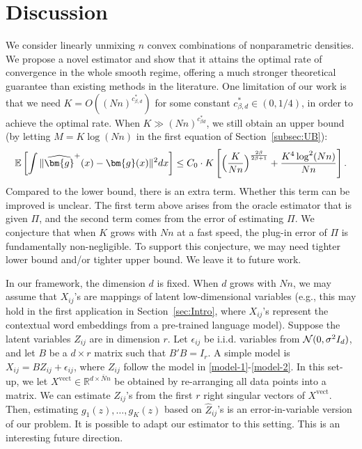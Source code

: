 \documentclass[preprint,11pt]{article}
\newcommand{\mbb}{\mathbb}
\numberwithin{equation}{section}
\begin{document}
\section{Discussion} \label{sec:Discuss}
We consider linearly unmixing $n$ convex combinations of nonparametric densities. 
We propose a novel estimator and show that it attains the optimal rate of convergence in the whole smooth regime, offering a much stronger theoretical guarantee than existing methods in the literature.  
One limitation of our work is that we need $K=O((Nn)^{c^*_{\beta,d}})$ for some constant $c^*_{\beta,d}\in (0,1/4)$, in order to achieve the optimal rate. 
When $K\gg (Nn)^{c^*_{\beta d}}$, we still obtain an upper bound (by letting $M=K\log(Nn)$ in the first equation of Section~\ref{subsec:UB}):
\[
\mbb{E}\left[\int \|\widehat{\bm{g}}^+(x)-\bm{g}(x)\|^2dx\right]\le C_0 \cdot K \left[\Bigl(\frac{K}{Nn}\Bigr)^{\frac{2\beta}{2\beta+1}}+\frac{K^4\log^2(Nn)}{Nn} \right]. 
\]
Compared to the lower bound, there is an extra term. Whether this term can be improved is unclear. The first term above arises from the oracle estimator that is given $\Pi$, and the second term comes from the error of estimating $\Pi$. 
We conjecture that when $K$ grows with $Nn$ at a fast speed, the plug-in error of $\Pi$ is fundamentally non-negligible. To support this conjecture, we may need tighter lower bound and/or tighter upper bound. We leave it to future work. 

In our framework, the dimension $d$ is fixed. When $d$ grows with $Nn$, we may assume that $X_{ij}$'s are mappings of latent low-dimensional variables (e.g., this may hold in the first application in Section~\ref{sec:Intro}, where $X_{ij}$'s represent the contextual word embeddings from a pre-trained language model). Suppose the latent variables $Z_{ij}$ are in dimension $r$. Let $\epsilon_{ij}$ be i.i.d. variables from ${\cal N}(0, \sigma^2I_d)$, and let $B$ be a $d\times r$ matrix such that $B'B=I_r$. A simple model is $X_{ij}=BZ_{ij}+\epsilon_{ij}$, where $Z_{ij}$ follow the model in \eqref{model-1}-\eqref{model-2}. 
In this set-up, we let $X^{\text{vect}}\in\mathbb{R}^{d\times \bar{N}n}$ be obtained by re-arranging all data points into a matrix. 
We can estimate $Z_{ij}$'s from the first $r$ right singular vectors of $X^{\text{vect}}$.  
Then, estimating $g_1(z), \ldots, g_K(z)$ based on $\hat{Z}_{ij}$'s is an error-in-variable version of our problem. 
It is possible to adapt our estimator to this setting. This is an interesting future direction. 
\end{document}
